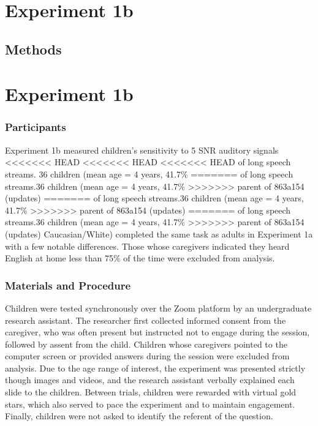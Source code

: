 \documentclass[10pt, letterpaper]{article}
\begin{document}
\hypertarget{experiment-1b}{%
\section{Experiment 1b}\label{experiment-1b}}

\hypertarget{methods-1}{%
\subsection{Methods}\label{methods-1}}

\hypertarget{experiment-1b-1}{%
\section{Experiment 1b}\label{experiment-1b-1}}

\hypertarget{participants-1}{%
\subsubsection{Participants}\label{participants-1}}

Experiment 1b measured children's sensitivity to 5 SNR auditory signals
<<<<<<< HEAD
<<<<<<< HEAD
<<<<<<< HEAD
of long speech streams. 36 children (mean age = 4 years, 41.7\%
=======
of long speech streams.36 children (mean age = 4 years, 41.7\%
>>>>>>> parent of 863a154 (updates)
=======
of long speech streams.36 children (mean age = 4 years, 41.7\%
>>>>>>> parent of 863a154 (updates)
=======
of long speech streams.36 children (mean age = 4 years, 41.7\%
>>>>>>> parent of 863a154 (updates)
Caucasian/White) completed the same task as adults in Experiment 1a with
a few notable differences. Those whose caregivers indicated they heard
English at home less than 75\% of the time were excluded from analysis.

\hypertarget{materials-and-procedure-1}{%
\subsubsection{Materials and
Procedure}\label{materials-and-procedure-1}}

Children were tested synchronously over the Zoom platform by an
undergraduate research assistant. The researcher first collected
informed consent from the caregiver, who was often present but
instructed not to engage during the session, followed by assent from the
child. Children whose caregivers pointed to the computer screen or
provided answers during the session were excluded from analysis. Due to
the age range of interest, the experiment was presented strictly though
images and videos, and the research assistant verbally explained each
slide to the children. Between trials, children were rewarded with
virtual gold stars, which also served to pace the experiment and to
maintain engagement. Finally, children were not asked to identify the
referent of the question.
\end{document}
